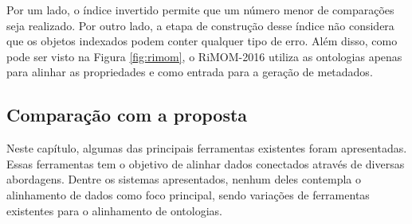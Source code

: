Por um lado, o índice invertido permite que um número menor de comparações seja realizado. Por outro lado, a etapa de construção desse índice não considera que os objetos indexados podem conter qualquer tipo de erro. Além disso, como pode ser visto na Figura \ref{fig:rimom}, o RiMOM-2016 utiliza as ontologias apenas para alinhar as propriedades e como entrada para a geração de metadados.

\subsection{Comparação com a proposta}

Neste capítulo, algumas das principais ferramentas existentes foram apresentadas. Essas ferramentas tem o objetivo de alinhar dados conectados através de diversas abordagens. Dentre os sistemas apresentados, nenhum deles contempla o alinhamento de dados como foco principal, sendo variações de ferramentas existentes para o alinhamento de ontologias.
% 
% 
%
%

